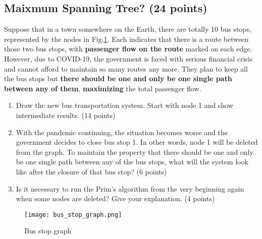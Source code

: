 \documentclass[11pt]{exam}
\begin{document}
\subsection{Maixmum Spanning Tree? (24 points)}
Suppose that in a town somewhere on the Earth, there are totally 10 bus stops, represented by the nodes in Fig.\ref{fig:bus_stop}. Each indicates that there is a route between those two bus stops, with \textbf{passenger flow on the route} marked on each edge.\\
However, due to COVID-19, the government is faced with serious financial crisis and cannot afford to maintain so many routes any more. They plan to keep all the bus stops but \textbf{there should be one and only be one single path between any of them}, \textbf{maximizing} the total passenger flow.
\begin{enumerate}[1)]
    \item Draw the new bus transportation system. Start with node 1 and show intermediate results. (14 points)
    \begin{solution}
    \end{solution}
    \item With the pandemic continuing, the situation becomes worse and the government decides to close bus stop 1. In other words, node 1 will be deleted from the graph. To maintain the property that there should be one and only be one single path between any of the bus stops, what will the system look like after the closure of that bus stop? (6 points)
    \begin{solution}
    \end{solution}
    \item Is it necessary to run the Prim's algorithm from the very beginning again when some nodes are deleted? Give your explanation. (4 points)
    \begin{solution}
    \end{solution}
\end{enumerate}
\begin{figure}
    \centering
    \texttt{[image: bus\_stop\_graph.png]}
    \caption{Bus stop graph}
    \label{fig:bus_stop}
\end{figure}
\newpage
\end{document}
